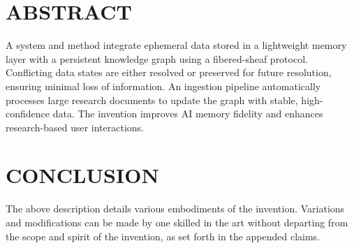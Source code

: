 \documentclass[12pt]{article}
\begin{document}
\section*{ABSTRACT}
A system and method integrate ephemeral data stored in a lightweight memory layer with a
persistent knowledge graph using a fibered-sheaf protocol. Conflicting data states are
either resolved or preserved for future resolution, ensuring minimal loss of information.
An ingestion pipeline automatically processes large research documents to update the graph
with stable, high-confidence data. The invention improves AI memory fidelity and
enhances research-based user interactions.

\section*{CONCLUSION}
The above description details various embodiments of the invention. Variations
and modifications can be made by one skilled in the art without departing from
the scope and spirit of the invention, as set forth in the appended claims.
\end{document}

